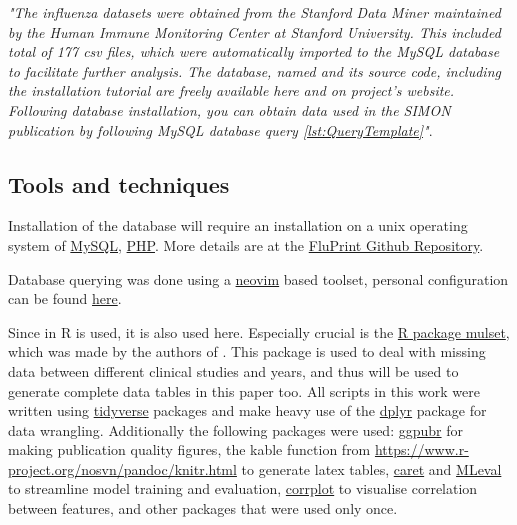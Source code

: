 \begin{displayquote}
    \textit{"The influenza datasets were obtained from the Stanford Data Miner maintained by
    the Human Immune Monitoring Center at Stanford University. This included
    total of 177 csv files, which were automatically imported to the MySQL
    database to facilitate further analysis. The database, named \flup and
    its source code, including the installation tutorial are freely available
    here and on project's website. Following database installation, you can
    obtain data used in the SIMON publication by following MySQL database
    query \autoref{lst:QueryTemplate}"}.
\end{displayquote}

\subsection{Tools and techniques}

Installation of the \flup database will require an installation on a
unix operating system of \href{https://www.mysql.com/}{MySQL},
\href{https://www.php.net/manual/en/install.php}{PHP}. More details are at the
\href{https://github.com/LogIN-/fluprint}{FluPrint Github Repository}.

Database querying was done using a \href{https://neovim.io/}{neovim} based toolset,
personal configuration can be found
\href{https://github.com/Vinkage/mike_neovim/tree/feature}{here}.

Since in \dpaper R is used, it is also used here.  Especially crucial is the
\href{https://cran.r-project.org/web/packages/mulset/index.html}{R package
mulset}, which was made by the authors of \spaper. This package is used to deal
with missing data between different clinical studies and years, and thus will
be used to generate complete data tables in this paper too. All scripts in this
work were written using \href{https://www.tidyverse.org/}{tidyverse} packages
and make heavy use of the \href{https://dplyr.tidyverse.org/}{dplyr} package
for data wrangling. Additionally the following packages were used:
\href{https://cran.r-project.org/web/packages/ggpubr/index.html}{ggpubr} for
making publication quality figures, the kable function from
\href{knitr}{https://www.r-project.org/nosvn/pandoc/knitr.html} to generate
latex tables, \href{https://topepo.github.io/caret/}{caret} and
\href{https://cran.r-project.org/web/packages/MLeval/index.html}{MLeval} to
streamline model training and evaluation,
\href{https://cran.r-project.org/web/packages/corrplot/vignettes/corrplot-intro.html}{corrplot}
to visualise correlation between features, and other packages that were used
only once.

